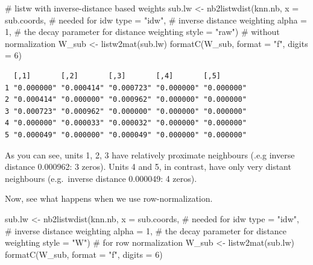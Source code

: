 \documentclass[
  letterpaper,
]{scrbook}
\newenvironment{Shaded}{\begin{snugshade}}{\end{snugshade}}
\newcommand{\AttributeTok}[1]{\textcolor[rgb]{0.40,0.45,0.13}{#1}}
\newcommand{\CommentTok}[1]{\textcolor[rgb]{0.37,0.37,0.37}{#1}}
\newcommand{\DecValTok}[1]{\textcolor[rgb]{0.68,0.00,0.00}{#1}}
\newcommand{\FunctionTok}[1]{\textcolor[rgb]{0.28,0.35,0.67}{#1}}
\newcommand{\NormalTok}[1]{\textcolor[rgb]{0.00,0.23,0.31}{#1}}
\newcommand{\OtherTok}[1]{\textcolor[rgb]{0.00,0.23,0.31}{#1}}
\newcommand{\StringTok}[1]{\textcolor[rgb]{0.13,0.47,0.30}{#1}}
\begin{document}
\begin{Shaded}
\begin{Highlighting}[]
\CommentTok{\# listw with inverse{-}distance based weights}
\NormalTok{sub.lw }\OtherTok{\textless{}{-}} \FunctionTok{nb2listwdist}\NormalTok{(knn.nb,}
                       \AttributeTok{x =}\NormalTok{ sub.coords, }\CommentTok{\# needed for idw}
                       \AttributeTok{type =} \StringTok{"idw"}\NormalTok{, }\CommentTok{\# inverse distance weighting}
                       \AttributeTok{alpha =} \DecValTok{1}\NormalTok{, }\CommentTok{\# the decay parameter for distance weighting}
                       \AttributeTok{style =} \StringTok{"raw"}\NormalTok{) }\CommentTok{\# without normalization}
\NormalTok{W\_sub }\OtherTok{\textless{}{-}} \FunctionTok{listw2mat}\NormalTok{(sub.lw)}
\FunctionTok{formatC}\NormalTok{(W\_sub, }\AttributeTok{format =} \StringTok{"f"}\NormalTok{, }\AttributeTok{digits =} \DecValTok{6}\NormalTok{)}
\end{Highlighting}
\end{Shaded}

\begin{verbatim}
  [,1]       [,2]       [,3]       [,4]       [,5]      
1 "0.000000" "0.000414" "0.000723" "0.000000" "0.000000"
2 "0.000414" "0.000000" "0.000962" "0.000000" "0.000000"
3 "0.000723" "0.000962" "0.000000" "0.000000" "0.000000"
4 "0.000000" "0.000033" "0.000032" "0.000000" "0.000000"
5 "0.000049" "0.000000" "0.000049" "0.000000" "0.000000"
\end{verbatim}

As you can see, units 1, 2, 3 have relatively proximate neighbours (.e.g
inverse distance 0.000962: 3 zeros). Units 4 and 5, in contrast, have
only very distant neighbours (e.g.~inverse distance 0.000049: 4 zeros).

Now, see what happens when we use row-normalization.

\begin{Shaded}
\begin{Highlighting}[]
\NormalTok{sub.lw }\OtherTok{\textless{}{-}} \FunctionTok{nb2listwdist}\NormalTok{(knn.nb,}
                       \AttributeTok{x =}\NormalTok{ sub.coords, }\CommentTok{\# needed for idw}
                       \AttributeTok{type =} \StringTok{"idw"}\NormalTok{, }\CommentTok{\# inverse distance weighting}
                       \AttributeTok{alpha =} \DecValTok{1}\NormalTok{, }\CommentTok{\# the decay parameter for distance weighting}
                       \AttributeTok{style =} \StringTok{"W"}\NormalTok{) }\CommentTok{\# for row normalization}
\NormalTok{W\_sub }\OtherTok{\textless{}{-}} \FunctionTok{listw2mat}\NormalTok{(sub.lw)}
\FunctionTok{formatC}\NormalTok{(W\_sub, }\AttributeTok{format =} \StringTok{"f"}\NormalTok{, }\AttributeTok{digits =} \DecValTok{6}\NormalTok{)}
\end{Highlighting}
\end{Shaded}
\end{document}
